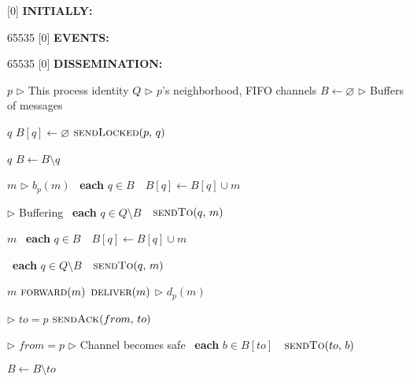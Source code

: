 
[0] {\textbf{INITIALLY:}}

{65535}{}
[0] {\textbf{EVENTS:}}

{65535}{}
[0] {\textbf{DISSEMINATION:}}


\newcommand{\comment}[1]{$\rhd$ #1}
\newcommand{\LINEIFTHEN}[2]{%
  \algorithmicif\ {#1}\ \algorithmicthen\ {#2} %
}
\newcommand{\LINEIFTHENELSE}[3]{%
  \algorithmicif\ {#1}\ \algorithmicthen\ {#2} \algorithmicelse\ {#3}%
}

\newcommand{\LINEFOR}[2]{%
  \algorithmicfor\ {#1}\ \algorithmicdo\ {#2} %
}

\begin{algorithmic}[1]
\small
  \initially
  \State $p$ \hfill \comment{This process identity}
  \State $Q$
  \hfill \comment{$p$'s neighborhood, FIFO channels}
  \State $B \leftarrow \varnothing$ 
  \hfill \comment{Buffers of messages}
  \endInitially
  
  \event
   {$q$}
  \State $B[q] \leftarrow \varnothing$
  \State $\textsc{sendLocked}(p,\, q)$
  \EndIf
  \EndFunction
  
  \Statex

   {$q$}
  \State $B \leftarrow B \setminus q$
  \EndFunction

  \endEvent

  \dissemination

   {$m$}
  \hfill \comment{$b_p(m)$}
  \State \LINEFOR{\textbf{each} $q \in B$}
  {$B[q] \leftarrow B[q] \cup m$}
  \hfill \comment{Buffering}%
  \State \LINEFOR{\textbf{each} $q \in Q \setminus B$} 
  {$\textsc{sendTo}(q,\, m)$}
  \EndFunction

  \Statex
  
   {$m$}
  \State \LINEFOR{\textbf{each} $q \in B$}
  {$B[q] \leftarrow B[q] \cup m$}
  \State \LINEFOR{\textbf{each} $q \in Q \setminus B$} 
  {$\textsc{sendTo}(q,\, m)$}
  \EndFunction

  \Statex

   {$m$}
  \State $\textsc{forward}(m)$
  \State $\textsc{deliver}(m)$ \hfill \comment{$d_p(m)$}
  \EndIf
  \EndFunction

  \Statex

   \hfill \comment{$to=p$}  
  \State $\textsc{sendAck}(from,\, to)$
  \EndFunction
  
  \Statex

   \hfill \comment{$from=p$}
   \hfill \comment{Channel becomes safe}
  \State \LINEFOR {\textbf{each} $b \in B[to]$}
  {$\textsc{sendTo}(to,\, b)$}
  \State $B \leftarrow B \setminus to$
  \EndIf
  \EndFunction

\end{algorithmic}



